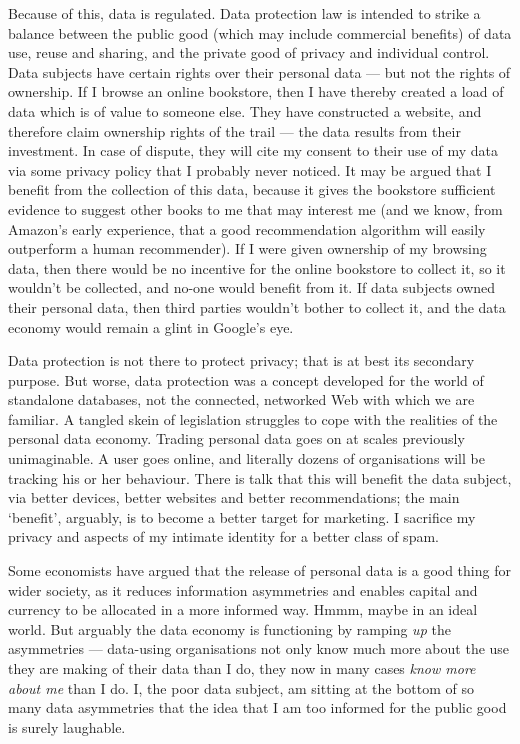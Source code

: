 \documentclass[graybox]{svmult}
\begin{document}
Because of this, data is regulated. Data protection law is intended to strike a balance between the public good (which may include commercial benefits) of data use, reuse and sharing, and the private good of privacy and individual control. Data subjects have certain rights over their personal data --- but not the rights of ownership. If I browse an online bookstore, then I have thereby created a load of data which is of value to someone else. They have constructed a website, and therefore claim ownership rights of the trail --- the data results from their investment. In case of dispute, they will cite my consent to their use of my data via some privacy policy that I probably never noticed. It may be argued that I benefit from the collection of this data, because it gives the bookstore sufficient evidence to suggest other books to me that may interest me (and we know, from Amazon's early experience, that a good recommendation algorithm will easily outperform a human recommender). If I were given ownership of my browsing data, then there would be no incentive for the online bookstore to collect it, so it wouldn't be collected, and no-one would benefit from it. If data subjects owned their personal data, then third parties wouldn't bother to collect it, and the data economy would remain a glint in Google's eye.

Data protection is not there to protect privacy; that is at best its secondary purpose. But worse, data protection was a concept developed for the world of standalone databases, not the connected, networked Web with which we are familiar. A tangled skein of legislation struggles to cope with the realities of the personal data economy. Trading personal data goes on at scales previously unimaginable. A user goes online, and literally dozens of organisations will be tracking his or her behaviour. There is talk that this will benefit the data subject, via better devices, better websites and better recommendations; the main `benefit', arguably, is to become a better target for marketing. I sacrifice my privacy and aspects of my intimate identity for a better class of spam.

Some economists \cite{posner1981} have argued that the release of personal data is a good thing for wider society, as it reduces information asymmetries and enables capital and currency to be allocated in a more informed way. Hmmm, maybe in an ideal world. But arguably the data economy is functioning by ramping {\em up} the asymmetries --- data-using organisations not only know much more about the use they are making of their data than I do, they now in many cases {\em know more about me} than I do. I, the poor data subject, am sitting at the bottom of so many data asymmetries that the idea that I am too informed for the public good is surely laughable.
\end{document}
